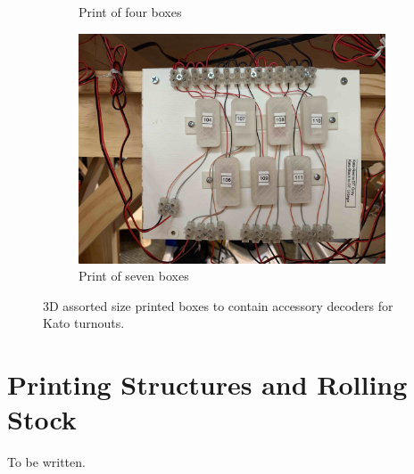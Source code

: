 \begin{figure}[htpb]
\begin{subfigure}[b] {0.475\textwidth}
         \caption{Print of four boxes}
        \end{subfigure}
        \quad
        \begin{subfigure}[b]  {0.475\textwidth}
            \centering 
            \includegraphics[width=\textwidth]{./figures/printer/SevenBoxes.jpg}
          \caption{Print of seven boxes}
        \end{subfigure}
        \caption {3D assorted size printed boxes to contain accessory decoders for Kato turnouts.} 
        \label{fig:decoderBoxes}
    \end{figure}
    
\section{Printing Structures and Rolling Stock}
To be written.